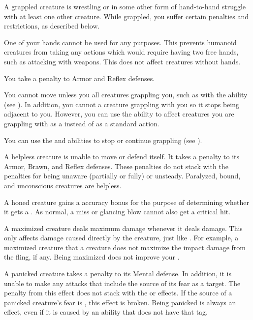    A grappled creature is wrestling or in some other form of hand-to-hand struggle with at least one other creature.
  While grappled, you suffer certain penalties and restrictions, as described below.
  \begin{raggeditemize}
    \item One of your hands cannot be used for any purposes.
      This prevents humanoid creatures from taking any actions which would require having two free hands, such as attacking with  weapons.
      This does not affect creatures without hands.
    \item You take a  penalty to Armor and Reflex defenses.
    \item You cannot move unless you  all creatures grappling you, such as with the  ability (see ).
      In addition, you cannot  a creature grappling with you so it stops being adjacent to you.
      However, you can use the  ability to affect creatures you are grappling with as a  instead of as a standard action.
    \item You can use the  and  abilities to stop or continue grappling (see ).
  \end{raggeditemize}

   A helpless creature is unable to move or defend itself.
  It takes a  penalty to its Armor, Brawn, and Reflex defenses.
  These penalties do not stack with the penalties for being unaware (partially or fully) or unsteady.
  Paralyzed, bound, and unconscious creatures are helpless.

   A honed creature gains a  accuracy bonus for the purpose of determining whether it gets a .
  As normal, a miss or glancing blow cannot also get a critical hit.

   A maximized creature deals maximum damage whenever it deals damage.
  This only affects damage caused directly by the creature, just like .
  For example, a maximized creature that  a creature does not maximize the impact damage from the fling, if any.
  Being maximized does not improve your .

   A panicked creature takes a  penalty to its Mental defense.
  In addition, it is unable to make any attacks that include the source of its fear as a target.
  The penalty from this effect does not stack with the \frightened or \panicked effects.
  If the source of a panicked creature's fear is , this effect is broken.
  Being panicked is always an  effect, even if it is caused by an ability that does not have that tag.

